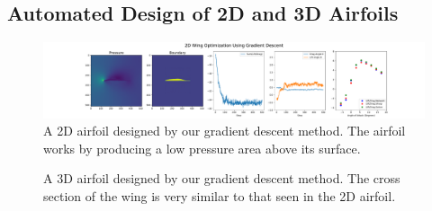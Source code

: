 \documentclass{article} %
\begin{document}
\subsection{Automated Design of 2D and 3D Airfoils}

\begin{figure}[h]
\begin{center}
\includegraphics[scale=0.25]{../test/figs/learn_gradient_descent.pdf}
\end{center}
\caption{A 2D airfoil designed by our gradient descent method. The airfoil works by producing a low pressure area above its surface.}
\label{learn_gradient_descent}
\end{figure}

\begin{figure}[h]
\begin{center}
\end{center}
\caption{A 3D airfoil designed by our gradient descent method. The cross section of the wing is very similar to that seen in the 2D airfoil.}
\label{learn_gradient_descent_3d}
\end{figure}
\end{document}
